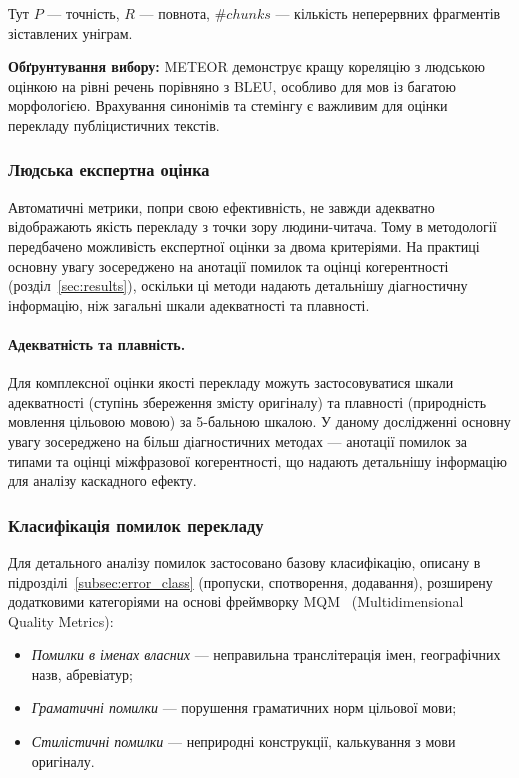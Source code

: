 Тут $P$ — точність, $R$ — повнота, $\#chunks$ — кількість неперервних
фрагментів зіставлених уніграм.

\textbf{Обґрунтування вибору:} METEOR демонструє кращу кореляцію з людською
оцінкою на рівні речень порівняно з BLEU, особливо для мов із багатою
морфологією. Врахування синонімів та стемінгу є важливим для оцінки
перекладу публіцистичних текстів.

\subsubsection{Людська експертна оцінка}

Автоматичні метрики, попри свою ефективність, не завжди адекватно відображають
якість перекладу з точки зору людини-читача. Тому в методології передбачено
можливість експертної оцінки за двома критеріями. На практиці основну увагу
зосереджено на анотації помилок та оцінці когерентності (розділ~\ref{sec:results}), оскільки
ці методи надають детальнішу діагностичну інформацію, ніж загальні шкали
адекватності та плавності.

\paragraph{Адекватність та плавність.}
Для комплексної оцінки якості перекладу можуть застосовуватися шкали
адекватності (ступінь збереження змісту оригіналу) та плавності
(природність мовлення цільовою мовою) за 5-бальною шкалою.
У даному дослідженні основну увагу зосереджено на більш діагностичних
методах --- анотації помилок за типами та оцінці міжфразової
когерентності, що надають детальнішу інформацію для аналізу каскадного
ефекту.

\subsubsection{Класифікація помилок перекладу}

Для детального аналізу помилок застосовано базову класифікацію, описану
в підрозділі~\ref{subsec:error_class} (пропуски, спотворення, додавання), розширену додатковими
категоріями на основі фреймворку MQM~\cite{mqm} (Multidimensional Quality
Metrics):
\begin{itemize}[nosep]
    \item \textit{Помилки в іменах власних} --- неправильна транслітерація
    імен, географічних назв, абревіатур;
    \item \textit{Граматичні помилки} --- порушення граматичних норм
    цільової мови;
    \item \textit{Стилістичні помилки} --- неприродні конструкції,
    калькування з мови оригіналу.
\end{itemize}

